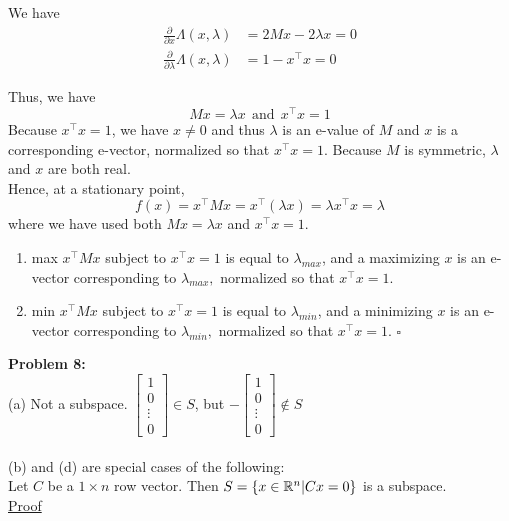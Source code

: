 \documentclass[letterpaper]{article}
\begin{document}
We have
    $$\begin{aligned}
        \frac{\partial}{\partial x}\Lambda(x,\lambda) &= 2Mx-2\lambda x = 0 \\
        \frac{\partial}{\partial \lambda}\Lambda(x,\lambda) &= 1-x^\top x = 0
    \end{aligned}$$

Thus, we have
    $$ Mx=\lambda x ~~\text{and}~~ x^\top x = 1 $$
Because $x^\top x=1$, we have $x\not= 0$ and thus $\lambda$ is an e-value of $M$ and $x$ is a corresponding e-vector, normalized so that $x^\top x=1$. Because $M$ is symmetric, $\lambda$ and $x$ are both real.
\medskip \\
Hence, at a stationary point,
$$ f(x)=x^\top M x = x^\top (\lambda x) = \lambda x^\top x = \lambda $$
where we have used both $Mx=\lambda x$ and $x^\top x =1$.
\begin{enumerate}
\setlength{\itemsep}{.1in}
\renewcommand{\labelenumi}{(\alph{enumi})}
\item max $x^\top M x$ subject to $x^\top x =1$ is equal to $\lambda_{max}$, and a maximizing $x$ is an e-vector corresponding to $\lambda_{max},$ normalized so that $x^\top x=1$.
\item min $x^\top M x$ subject to $x^\top x =1$ is equal to $\lambda_{min}$, and a minimizing $x$ is an e-vector corresponding to $\lambda_{min},$ normalized so that $x^\top x=1$.
\hfill $\square$
\end{enumerate}


\noindent \textbf{Problem 8:}
\medskip \\
(a) Not a subspace. $\begin{bmatrix} 1 \\ 0 \\ \vdots \\ 0 \end{bmatrix} \in S$, but $-\begin{bmatrix} 1 \\ 0 \\ \vdots \\ 0 \end{bmatrix} \notin S$ \\
\medskip \\
(b) and (d) are special cases of the following:
\medskip \\
Let $C$ be a $1 \times n$ row vector. Then $S=\{x\in \mathbb R^n | Cx=0\}$ is a subspace.
\medskip \\
\underline{Proof}
\end{document}
